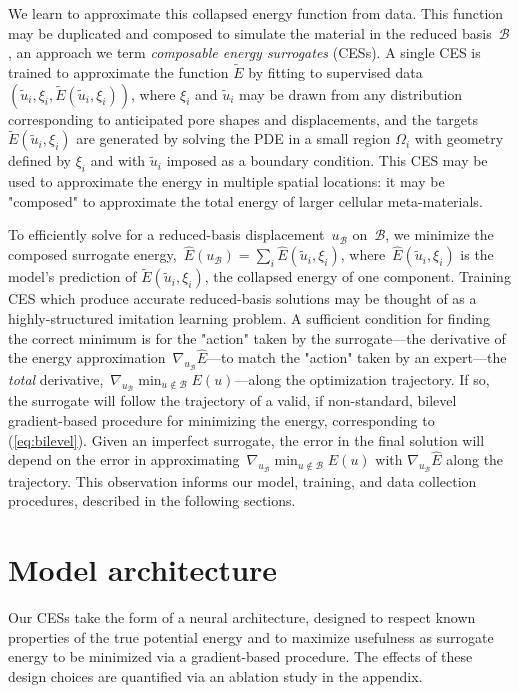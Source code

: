 We learn to approximate this collapsed energy function from data. This function may be duplicated and composed to simulate the material in the reduced basis~$\mathcal{B}$, an approach we term \emph{composable energy surrogates} (CESs).
A single CES is trained to approximate the function $\tilde{E}$ by fitting to supervised data~${(\tilde{u}_i, \xi_i, \tilde{E}(\tilde{u}_i, \xi_i))}$, where $\xi_i$ and $\tilde{u}_i$ may be drawn from any distribution corresponding to anticipated pore shapes and displacements, and the targets $\tilde{E}(\tilde{u}_i, \xi_i)$ are generated by solving the PDE in a small region $\Omega_i$ with geometry defined by $\xi_i$ and with $\tilde{u}_i$ imposed as a boundary condition.
This CES may be used to approximate the energy in multiple spatial locations: it may be "composed" to approximate the total energy of larger cellular meta-materials.

To efficiently solve for a reduced-basis displacement~$u_{\mathcal{B}}$ on~$\mathcal{B}$,
we minimize the composed surrogate energy,~${\hat{E}(u_\mathcal{B}) = \sum_i \hat{E}(\tilde{u}_i, \xi_i)}$, where~$\hat{E}(\tilde{u}_i, \xi_i)$ is the model's
prediction of $\tilde{E}(\tilde{u}_i, \xi_i)$, the collapsed energy of one component.
Training CES which produce accurate reduced-basis solutions may
be thought of as a highly-structured imitation learning problem.
A sufficient condition for finding the correct minimum is for the "action" taken by the surrogate---the derivative of the energy approximation~${\nabla_{u_{\mathcal{B}}} \hat{E}}$---to match the "action" taken by an expert---the \emph{total} derivative,~${\nabla_{u_{\mathcal{B}}} \min_{u\notin \mathcal{B}} E(u)}$---along the optimization trajectory.
If so, the surrogate will follow the trajectory of a valid, if non-standard, bilevel gradient-based procedure for minimizing the energy, corresponding to (\ref{eq:bilevel}). Given an imperfect surrogate, the error in the final solution will depend on
the error in approximating~${\nabla_{u_{\mathcal{B}}} \min_{u\notin \mathcal{B}} E(u)}$
with $\nabla_{u_{\mathcal{B}}} \hat{E}$ along the trajectory.
This observation informs our model, training, and data collection procedures, described in the following sections.
\section{Model architecture}
\label{sec:model}
Our CESs take the form of a neural architecture, designed to respect known properties of the true potential energy and to maximize usefulness as surrogate energy to be minimized via a gradient-based procedure.
The effects of these design choices are quantified via an ablation study in the appendix.


